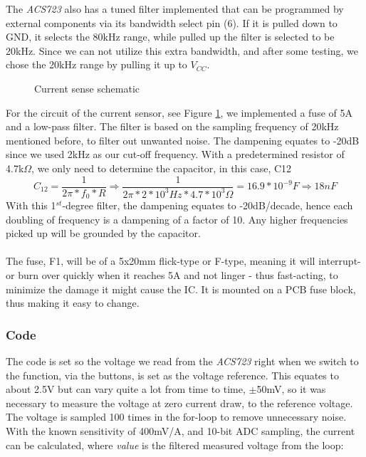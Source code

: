 The \textit{ACS723} also has a tuned filter implemented that can be programmed by external components via its bandwidth select pin (6). If it is pulled down to GND, it selects the 80kHz range, while pulled up the filter is selected to be 20kHz. Since we can not utilize this extra bandwidth, and after some testing, we chose the 20kHz range by pulling it up to $V_{CC}$.
\begin{figure}[h]
    \centering
    \caption{Current sense schematic}
    \label{fig:CurrSch}
\end{figure}

For the circuit of the current sensor, see Figure \ref{fig:CurrSch}, we implemented a fuse of 5A and a low-pass filter. The filter is based on the sampling frequency of 20kHz mentioned before, to filter out unwanted noise. The dampening equates to -20dB since we used 2kHz as our cut-off frequency. With a predetermined resistor of 4.7k$\Omega$, we only need to determine the capacitor, in this case, C12
\[C_{12}=\frac{1}{2\pi*f_0*R}\Rightarrow\frac{1}{2\pi*2*10^3Hz*4.7*10^3\Omega}=16.9*10^{-9}F\Rightarrow18nF\]
With this 1$^{st}$-degree filter, the dampening equates to -20dB/decade, hence each doubling of frequency is a dampening of a factor of 10. Any higher frequencies picked up will be grounded by the capacitor.
\\\\
The fuse, F1, will be of a 5x20mm flick-type or F-type, meaning it will interrupt- or burn over quickly when it reaches 5A and not linger - thus fast-acting, to minimize the damage it might cause the IC. It is mounted on a PCB fuse block, thus making it easy to change.
\subsubsection{Code}
The code is set so the voltage we read from the \textit{ACS723} right when we switch to the function, via the buttons, is set as the voltage reference. This equates to about 2.5V but can vary quite a lot from time to time, $\pm$50mV, so it was necessary to measure the voltage at zero current draw, to the reference voltage. The voltage is sampled 100 times in the for-loop to remove unnecessary noise. With the known sensitivity of 400mV/A, and 10-bit ADC sampling, the current can be calculated, where \textit{value} is the filtered measured voltage from the loop:

